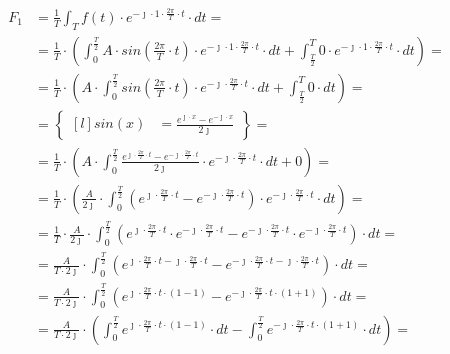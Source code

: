 \begin{task}
\begin{align*}
F_1&=\frac{1}{T}\int_{T}f(t) \cdot e^{-\jmath \cdot 1 \cdot \frac{2\pi}{T} \cdot t} \cdot dt=\\
&=\frac{1}{T}\cdot\left(\int_{0}^{\frac{T}{2}}A \cdot sin\left( \frac{2\pi}{T} \cdot t\right) \cdot e^{-\jmath \cdot 1 \cdot \frac{2\pi}{T} \cdot t} \cdot dt+\int_{\frac{T}{2}}^{T} 0 \cdot e^{-\jmath \cdot 1 \cdot \frac{2\pi}{T} \cdot t} \cdot dt\right)=\\
&=\frac{1}{T}\cdot\left(A \cdot \int_{0}^{\frac{T}{2}}sin\left( \frac{2\pi}{T} \cdot t\right) \cdot e^{-\jmath \cdot \frac{2\pi}{T} \cdot t} \cdot dt+\int_{\frac{T}{2}}^{T} 0 \cdot dt\right)=\\
&=\begin{Bmatrix*}[l]
sin\left(x\right)&=\frac{e^{\jmath \cdot x}-e^{-\jmath \cdot x}}{2 \jmath }
\end{Bmatrix*}=\\
&=\frac{1}{T}\cdot\left(A \cdot \int_{0}^{\frac{T}{2}} \frac{e^{\jmath \cdot \frac{2\pi}{T} \cdot t}-e^{-\jmath \cdot \frac{2\pi}{T} \cdot t}}{2\jmath} \cdot e^{-\jmath \cdot \frac{2\pi}{T} \cdot t} \cdot dt+0\right)=\\
&=\frac{1}{T}\cdot\left(\frac{A}{2\jmath} \cdot \int_{0}^{\frac{T}{2}} \left(e^{\jmath \cdot \frac{2\pi}{T} \cdot t}-e^{-\jmath \cdot \frac{2\pi}{T} \cdot t}\right)\cdot e^{-\jmath \cdot \frac{2\pi}{T} \cdot t} \cdot dt\right)=\\
&=\frac{1}{T} \cdot \frac{A}{2\jmath} \cdot \int_{0}^{\frac{T}{2}}
\left( e^{\jmath \cdot \frac{2\pi}{T} \cdot t} \cdot e^{-\jmath \cdot \frac{2\pi}{T} \cdot t} - e^{-\jmath \cdot \frac{2\pi}{T} \cdot t} \cdot e^{-\jmath \cdot \frac{2\pi}{T} \cdot t} \right) \cdot dt=\\
&=\frac{A}{T\cdot 2\jmath} \cdot \int_{0}^{\frac{T}{2}}
\left(e^{\jmath \cdot \frac{2\pi}{T} \cdot t -\jmath \cdot \frac{2\pi}{T} \cdot t} - e^{-\jmath \cdot \frac{2\pi}{T} \cdot t -\jmath \cdot \frac{2\pi}{T} \cdot t} \right) \cdot dt=\\
&=\frac{A}{T\cdot 2\jmath} \cdot \int_{0}^{\frac{T}{2}}
\left(e^{\jmath \cdot \frac{2\pi}{T} \cdot t \cdot \left(1 - 1\right)} - e^{-\jmath \cdot \frac{2\pi}{T} \cdot t \cdot \left(1+1\right)} \right) \cdot dt=\\
&=\frac{A}{T\cdot 2\jmath} \cdot \left( \int_{0}^{\frac{T}{2}}
e^{\jmath \cdot \frac{2\pi}{T} \cdot t \cdot \left(1 - 1\right)} \cdot dt - \int_{0}^{\frac{T}{2}} e^{-\jmath \cdot \frac{2\pi}{T} \cdot t \cdot \left(1+1\right)} \cdot dt \right)=\\

\end{align*}
\end{task}
